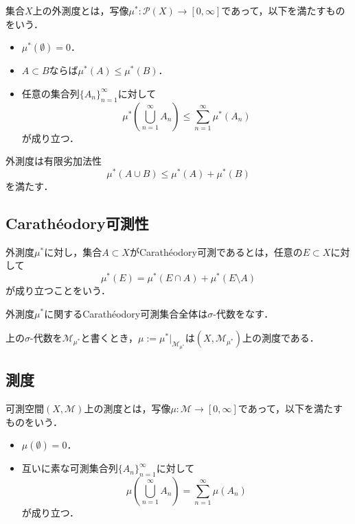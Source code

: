 \begin{definition}
    集合$X$上の外測度とは，写像$\mu^* : \mathcal P(X) \to [0,\infty]$であって，以下を満たすものをいう．
    \begin{itemize}
        \item $\mu^*(\emptyset)=0$．
        \item $A \subset B$ならば$\mu^*(A) \le \mu^*(B)$．
        \item 任意の集合列$\{A_n\}_{n=1}^{\infty}$に対して
        \[
        \mu^*\left(\bigcup_{n=1}^{\infty} A_n\right) \le \sum_{n=1}^{\infty} \mu^*(A_n)
        \]
        が成り立つ．
    \end{itemize}
\end{definition}

\begin{proposition}
    外測度は有限劣加法性
    \[
    \mu^*(A \cup B) \le \mu^*(A) + \mu^*(B)
    \]
    を満たす．
\end{proposition}

\subsection{Carathéodory可測性}

\begin{definition}
    外測度$\mu^*$に対し，集合$A \subset X$がCarathéodory可測であるとは，任意の$E \subset X$に対して
    \[
    \mu^*(E) = \mu^*(E \cap A) + \mu^*(E \setminus A)
    \]
    が成り立つことをいう．
\end{definition}

\begin{theorem}[Carathéodory]
    外測度$\mu^*$に関するCarathéodory可測集合全体は$\sigma$-代数をなす．
\end{theorem}

\begin{theorem}
    上の$\sigma$-代数を$\mathcal M_{\mu^*}$と書くとき，$\mu := \mu^*|_{\mathcal M_{\mu^*}}$は$(X,\mathcal M_{\mu^*})$上の測度である．
\end{theorem}

\subsection{測度}

\begin{definition}
    可測空間$(X,\mathcal M)$上の測度とは，写像$\mu : \mathcal M \to [0,\infty]$であって，以下を満たすものをいう．
    \begin{itemize}
        \item $\mu(\emptyset)=0$．
        \item 互いに素な可測集合列$\{A_n\}_{n=1}^{\infty}$に対して
        \[
        \mu\left(\bigcup_{n=1}^{\infty} A_n\right) = \sum_{n=1}^{\infty} \mu(A_n)
        \]
        が成り立つ．
    \end{itemize}
\end{definition}

